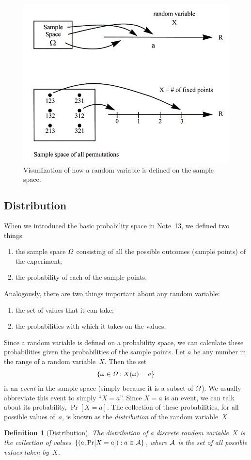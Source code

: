 \documentclass[11pt]{article}
\def\ul#1{\underline{#1}}
\def\Omega{\mathchar"10A }
\def\Omega{\mathchar"10A }
\def\Aset{{\cal A}}
\newcounter{thm}
\newtheorem{definition}{Definition}[thm]
\begin{document}
\begin{figure}[h!t!b!p!]
\centering
\includegraphics[scale=0.92]{rv}
\caption{Visualization of how a random variable is defined on the sample space.}
\label{fig:rv}
\end{figure}

\subsection*{Distribution}

When we introduced the basic probability space in Note~13, we defined two things:
\begin{enumerate} %
  \item the sample space $\Omega$ consisting of all the possible outcomes (sample points) of the experiment;
  \item the probability of each of the sample points.
\end{enumerate}

\pagebreak
Analogously, there are two things important about any random variable:
\begin{enumerate} %
  \item the set of values that it can take;
  \item the probabilities with which it takes on the values.
\end{enumerate}
Since a random variable is defined on a probability space, we can calculate these probabilities given the probabilities of the sample points.
Let $a$ be any number in  the range of a random variable~$X$.
Then the set $$
   \{\omega\in\Omega:X(\omega)=a\}  $$
is an {\it event\/} in the sample space (simply because it is a subset of $\Omega$).  We usually abbreviate
this event to simply ``$X=a$''.  Since $X=a$ is an event, we can
talk about its probability, $\Pr[X=a]$.  The collection of these
probabilities, for all possible values of~$a$, is known as the
{\it distribution\/} of the random variable~$X$.
\begin{definition}[Distribution]
The \ul{distribution} of a discrete random variable~$X$ is the
collection of values $\{(a,\Pr[X=a]):a\in\Aset\}$, where $\Aset$
is the set of all possible values taken by~$X$.
\end{definition}
\end{document}
